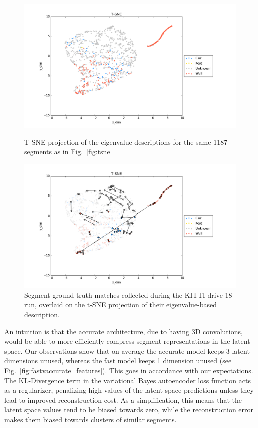 \begin{figure}[p]
  \centering
  \includegraphics[width=5.2in]{images/t-sne_eig.png}
\caption{T-SNE projection of the eigenvalue descriptions for the same 1187 segments as in Fig.~\ref{fig:tsne}}
  \label{fig:tsne_eig}
  \hfill
  \includegraphics[width=5.2in]{images/t-sne_matches_eig.png}
\caption{Segment ground truth matches collected during the KITTI drive 18 run, overlaid on the t-SNE projection of their eigenvalue-based description.}
  \label{fig:tsne_matches_eig}
\end{figure}


An intuition is that the accurate architecture, due to having 3D convolutions, would be able to more efficiently compress segment representations in the latent space. Our observations show that on average the accurate model keeps 3 latent dimensions unused, whereas the fast model keeps 1 dimension unused (see Fig.~\ref{fig:fastvaccurate_features}). This goes in accordance with our expectations.\\

The KL-Divergence term in the variational Bayes autoencoder loss function acts as a regularizer, penalizing high values of the latent space predictions unless they lead to improved reconstruction cost. As a simplification, this means that the latent space values tend to be biased towards zero, while the reconstruction error makes them biased towards clusters of similar segments.\\

